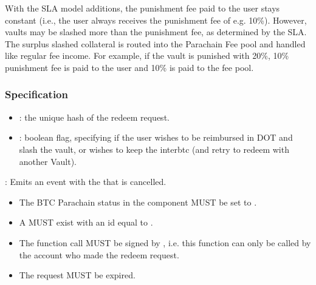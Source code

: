 \documentclass[a4paper,10pt,english]{sphinxmanual}
\begin{document}
With the SLA model additions, the punishment fee paid to the user stays constant (i.e., the user always receives the punishment fee of e.g. 10\%). However, vaults may be slashed more than the punishment fee, as determined by the SLA. The surplus slashed collateral is routed into the Parachain Fee pool and handled like regular fee income. For example, if the vault is punished with 20\%, 10\% punishment fee is paid to the user and 10\% is paid to the fee pool.


\subsubsection{Specification}
\label{\detokenize{spec/redeem:id11}}


\begin{itemize}
\item {} 
: the unique hash of the redeem request.

\item {} 
: boolean flag, specifying if the user wishes to be reimbursed in DOT and slash the vault, or wishes to keep the interbtc (and retry to redeem with another Vault).

\end{itemize}


: Emits an event with the  that is cancelled.

\begin{itemize}
\item {} 
The BTC Parachain status in the {\hyperref[\detokenize{spec/security:security}]{}} component MUST be set to .

\item {} 
A   MUST exist with an id equal to .

\item {} 
The function call MUST be signed by , i.e. this function can only be called by the account who made the redeem request.

\item {} 
The request MUST be expired.

\end{itemize}
\end{document}
